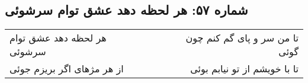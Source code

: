 \begin{center}
\section*{شماره ۵۷: هر لحظه دهد عشق توام سرشوئی}
\label{sec:057}
\begin{longtable}{l p{0.5cm} r}
هر لحظه دهد عشق توام سرشوئی
&&
تا من سر و پای گم کنم چون گوئی
\\
از هر مژهای اگر بریزم جوئی
&&
تا با خویشم از تو نیابم بوئی
\\
\end{longtable}
\end{center}
